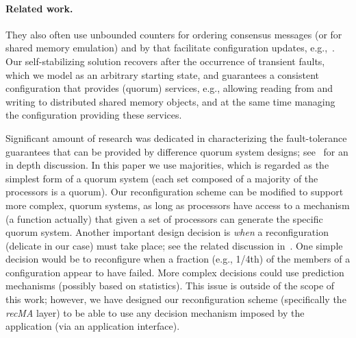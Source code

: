 \documentclass[11pt]{article}
\newcommand{\remove}[1]{}
\begin{document}
\paragraph{Related work.}
They also often use unbounded counters for ordering consensus messages (or for shared memory emulation) and by that facilitate configuration updates, e.g.,~\cite{RAMBO}. 
Our self-stabilizing solution recovers after the occurrence of transient faults, which we model as an arbitrary starting state, and guarantees a consistent configuration that provides (quorum) services, e.g., allowing reading from and writing to distributed shared memory objects, and at the same time managing the configuration providing these services.


Significant amount of research was dedicated in characterizing the fault-tolerance guarantees that can be provided by
difference quorum system designs; see~\cite{DBLP:series/synthesis/2012Vukolic} for an in depth discussion. 
In this paper we use majorities, which is regarded as the simplest form of a quorum system (each set composed of a majority of the processors is a quorum). 
Our reconfiguration scheme can be modified to support more complex, quorum systems, as long as processors have access to a mechanism (a function actually) that given a set of processors can generate the specific quorum system. 
Another important design decision is \emph{when} a reconfiguration (delicate in our case) must take place; see the related discussion
in~\cite{DBLP:journals/cacm/MusialNS14}. One simple decision would be to reconfigure when a fraction (e.g., 1/4th) of the members of a configuration appear to have failed. More complex decisions could use prediction mechanisms (possibly based on statistics). 
This issue is outside of the scope of this work; however, we have designed our reconfiguration scheme (specifically  the {\em recMA} layer) to be able to use any decision mechanism imposed by the application (via an application interface).

\remove{

}
\end{document}

